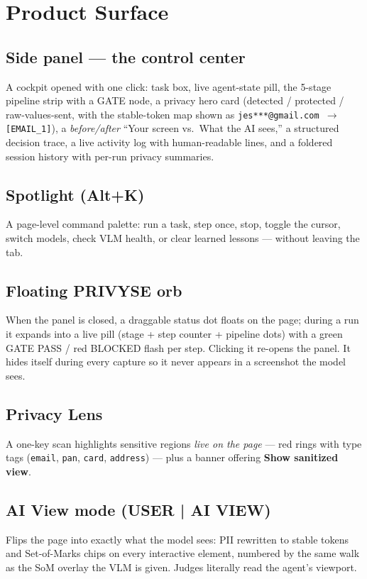\documentclass[11pt,a4paper]{article}
\begin{document}
\section{Product Surface}

\subsection{Side panel --- the control center}
A cockpit opened with one click: task box, live agent-state pill, the
5-stage pipeline strip with a \textsc{GATE} node, a privacy hero card
(detected / protected / raw-values-sent, with the stable-token map shown as
\texttt{jes***@gmail.com $\rightarrow$ [EMAIL\_1]}), a \emph{before/after}
``Your screen vs.\ What the AI sees,'' a structured decision trace, a live
activity log with human-readable lines, and a foldered session history with
per-run privacy summaries.

\subsection{Spotlight (Alt+K)}
A page-level command palette: run a task, step once, stop, toggle the cursor,
switch models, check VLM health, or clear learned lessons --- without leaving
the tab.

\subsection{Floating PRIVYSE orb}
When the panel is closed, a draggable status dot floats on the page; during a
run it expands into a live pill (stage + step counter + pipeline dots) with a
green \textsc{GATE PASS} / red \textsc{BLOCKED} flash per step. Clicking it
re-opens the panel. It hides itself during every capture so it never appears
in a screenshot the model sees.

\subsection{Privacy Lens}
A one-key scan highlights sensitive regions \emph{live on the page} --- red
rings with type tags (\texttt{email}, \texttt{pan}, \texttt{card},
\texttt{address}) --- plus a banner offering \textbf{Show sanitized view}.

\subsection{AI View mode (USER | AI VIEW)}
Flips the page into exactly what the model sees: PII rewritten to stable
tokens and Set-of-Marks chips on every interactive element, numbered by the
same walk as the SoM overlay the VLM is given. Judges literally read the
agent's viewport.
\end{document}
